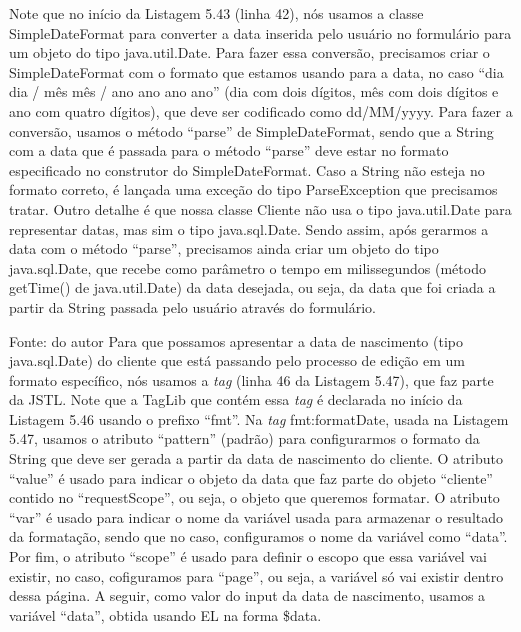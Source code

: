 Note que no início da Listagem 5.43 (linha 42), nós usamos a classe SimpleDateFormat para converter a data inserida pelo usuário no formulário para um objeto do tipo java.util.Date. Para fazer essa conversão, precisamos criar o SimpleDateFormat com o formato que estamos usando para a data, no caso ``dia dia / mês mês / ano ano ano ano'' (dia com dois dígitos, mês com dois dígitos e ano com quatro dígitos), que deve ser codificado como dd/MM/yyyy.  Para fazer a conversão, usamos o método ``parse'' de SimpleDateFormat, sendo que a String com a data que é passada para o método ``parse'' deve estar no formato especificado no construtor do SimpleDateFormat. Caso a String não esteja no formato correto, é lançada uma exceção do tipo ParseException que precisamos tratar.
Outro detalhe é que nossa classe Cliente não usa o tipo java.util.Date para representar datas, mas sim o tipo java.sql.Date. Sendo assim, após gerarmos a data com o método ``parse'', precisamos ainda criar um objeto do tipo java.sql.Date, que recebe como parâmetro o tempo em milissegundos (método getTime() de java.util.Date) da data desejada, ou seja, da data que foi criada a partir da String passada pelo usuário através do formulário.


Fonte: do autor
Para que possamos apresentar a data de nascimento (tipo java.sql.Date) do cliente que está passando pelo processo de edição em um formato específico, nós usamos a \textit{tag}  (linha 46 da Listagem 5.47), que faz parte da JSTL. Note que a TagLib que contém essa \textit{tag} é declarada no início da Listagem 5.46 usando o prefixo ``fmt''. Na \textit{tag} fmt:formatDate, usada na Listagem 5.47, usamos o atributo ``pattern'' (padrão) para configurarmos o formato da String que deve ser gerada a partir da data de nascimento do cliente. O atributo ``value'' é usado para indicar o objeto da data que faz parte do objeto ``cliente'' contido no ``requestScope'', ou seja, o objeto que queremos formatar. O atributo ``var'' é usado para indicar o nome da variável usada para armazenar o resultado da formatação, sendo que no caso, configuramos o nome da variável como ``data''. Por fim, o atributo ``scope'' é usado para definir o escopo que essa variável vai existir, no caso, cofiguramos para ``page'', ou seja, a variável só vai existir dentro dessa página. A seguir, como valor do input da data de nascimento, usamos a variável ``data'', obtida usando EL na forma \${data}.

